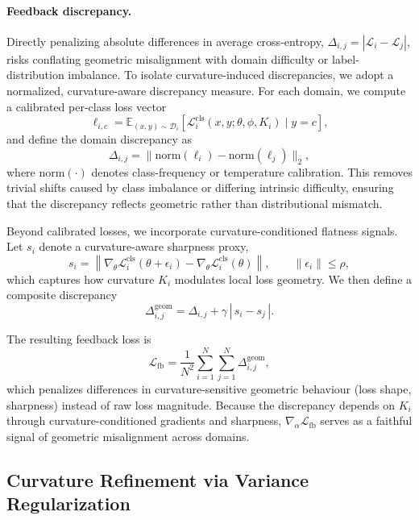 \documentclass[10pt]{article} %
\begin{document}
\paragraph{Feedback discrepancy.}
Directly penalizing absolute differences in average cross-entropy,
$\Delta_{i,j} = |\mathcal{L}_i - \mathcal{L}_j|$, risks conflating geometric
misalignment with domain difficulty or label-distribution imbalance. To isolate
curvature-induced discrepancies, we adopt a normalized, curvature-aware
discrepancy measure. For each domain, we compute a calibrated per-class loss
vector
\[
\ell_{i,c}
=
\mathbb{E}_{(x,y)\sim\mathcal{D}_i}
\!\left[
\mathcal{L}_{i}^{\mathrm{cls}}(x,y;\theta,\phi,K_i)
\;\big|\; y=c
\right],
\]
and define the domain discrepancy as
\[
\Delta_{i,j}
=
\big\|
\mathrm{norm}(\ell_i) - \mathrm{norm}(\ell_j)
\big\|_2,
\]
where $\mathrm{norm}(\cdot)$ denotes class-frequency or temperature calibration.
This removes trivial shifts caused by class imbalance or differing intrinsic
difficulty, ensuring that the discrepancy reflects geometric rather than
distributional mismatch.

Beyond calibrated losses, we incorporate curvature-conditioned flatness
signals. Let $s_i$ denote a curvature-aware sharpness proxy,
\[
s_i
=
\left\|
\nabla_{\theta}
\mathcal{L}_{i}^{\mathrm{cls}}(\theta + \epsilon_i)
-
\nabla_{\theta}
\mathcal{L}_{i}^{\mathrm{cls}}(\theta)
\right\|,
\qquad
\|\epsilon_i\|\le\rho,
\]
which captures how curvature $K_i$ modulates local loss geometry.
We then define a composite discrepancy
\[
\Delta_{i,j}^{\mathrm{geom}}
=
\Delta_{i,j}
+
\gamma\, |\,s_i - s_j\,|.
\]

The resulting feedback loss is
\begin{equation}
\mathcal{L}_{\mathrm{fb}}
=
\frac{1}{N^2}
\sum_{i=1}^{N}\sum_{j=1}^{N}
\Delta_{i,j}^{\mathrm{geom}},
\label{eq:fb-lorentz-corrected}
\end{equation}
which penalizes differences in curvature-sensitive geometric behaviour (loss
shape, sharpness) instead of raw loss magnitude. Because the discrepancy
depends on $K_i$ through curvature-conditioned gradients and sharpness,
$\nabla_{\alpha}\mathcal{L}_{\mathrm{fb}}$ serves as a faithful signal of
geometric misalignment across domains.

\subsection{Curvature Refinement via Variance Regularization}
\label{sec:curvature-var}
\end{document}
